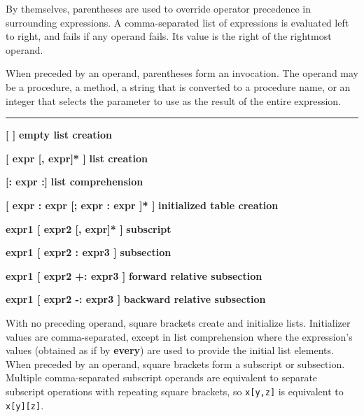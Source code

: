 \noindent
By themselves, parentheses are used
to override operator precedence in surrounding expressions. A
comma-separated list of expressions is evaluated left to right, and
fails if any operand fails. Its value is the right of the rightmost
operand.

When preceded by an operand, parentheses form an
invocation. The operand may be a procedure,
a method, a string that is converted to a procedure name, or an integer
that selects the parameter to use as the result of the entire expression.

\bigskip\hrule\vspace{0.1cm}

\noindent
{\bf \textbf{[} \textbf{]} } \hfill {\bf empty list creation}

\noindent
{\bf \textbf{[} expr [, expr]* \textbf{]} } \hfill {\bf list creation}

\noindent
{\bf \textbf{[:} expr \textbf{:]} } \hfill {\bf list comprehension}

\noindent
{\bf \textbf{[} expr : expr [; expr : expr ]* \textbf{]} } \hfill {\bf
initialized table creation}

\noindent
{\bf expr1 \textbf{[} expr2 [, expr]* \textbf{]} } \hfill {\bf subscript}

\noindent
{\bf expr1 \textbf{[} expr2 : expr3 \textbf{]} } \hfill {\bf subsection}\WarningNotThreadSafe
{}

\noindent
{\bf expr1 \textbf{[} expr2 +: expr3 \textbf{]} } \hfill {\bf forward relative subsection}

\noindent
{\bf expr1 \textbf{[} expr2 -: expr3 \textbf{]} } \hfill {\bf backward relative subsection}

\noindent
With no preceding operand, square brackets create and initialize lists.
Initializer values are comma-separated, except in list comprehension
where the expression's values (obtained as if by \textbf{every}) are used
to provide the initial list elements.
When preceded by an operand, square brackets form a subscript or
subsection. Multiple comma-separated subscript operands are equivalent
to separate subscript operations with repeating square brackets, so
\texttt{x[y,z]} is equivalent to \texttt{x[y][z]}.

